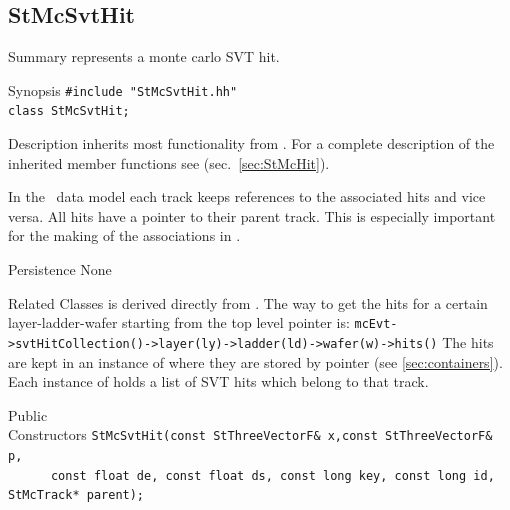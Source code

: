 \clearpage
%
%
\subsection{StMcSvtHit}
 
\label{sec:StMcSvtHit}
\begin{Entry}
\item[Summary]
     represents a monte carlo SVT hit.

\item[Synopsis]
    \verb+#include "StMcSvtHit.hh"+\\
    \verb+class StMcSvtHit;+\\

\item[Description]    
     inherits most functionality from .
    For a complete description of the inherited member functions see
     (sec.~\ref{sec:StMcHit}).

    In the \StMcEvent\ data model each track keeps references to the
    associated hits and vice versa. All hits have a pointer to their
    parent track.  This is especially important for the making of the
    associations in \StAssociationMaker. 
    
    
    
\item[Persistence]
    None

\item[Related Classes]
     is derived directly from .
    The way to get the hits for a
    certain layer-ladder-wafer starting
    from the top level  pointer is:
    \verb+mcEvt->svtHitCollection()->layer(ly)->ladder(ld)->wafer(w)->hits()+
    The hits are kept in an instance of 
    where they are stored by pointer (see \ref{sec:containers}).
    Each instance of  holds a list of SVT hits
    which belong to that track.

\item[Public\\ Constructors]
    \verb+StMcSvtHit(const StThreeVectorF& x,const StThreeVectorF& p,+\\
    \verb+      const float de, const float ds, const long key, const long id, StMcTrack* parent);+\\
    

\end{Entry}
